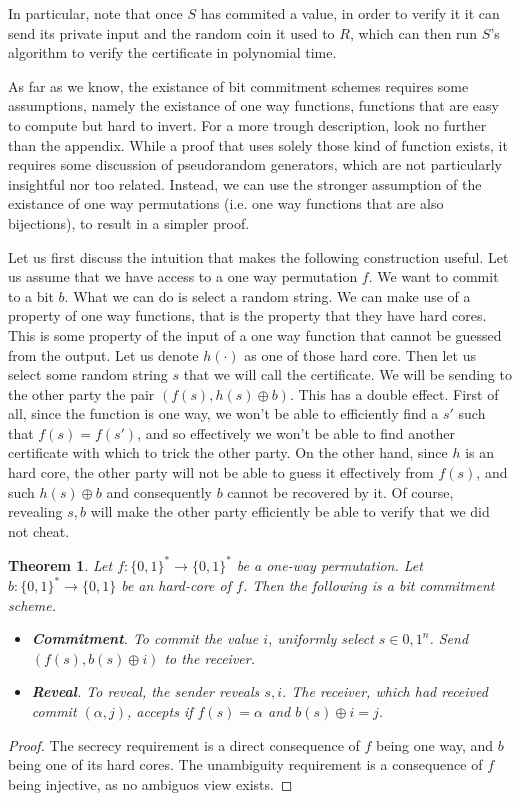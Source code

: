 \documentclass{article}
\newtheorem{theorem}{Theorem}
\begin{document}
In particular, note that once $S$ has commited a value, in order to verify it it can send its private input and the random coin it used to $R$, which can then
run $S$'s algorithm to verify the certificate in polynomial time. \par
As far as we know, the existance of bit commitment schemes requires some assumptions, namely the existance of one way functions, functions that are easy to compute but hard to invert.
For a more trough description, look no further than the appendix.
While a proof that uses solely those kind of function exists, it requires some discussion of pseudorandom generators, which are not particularly insightful nor too related.
Instead, we can use the stronger assumption of the existance of one way permutations (i.e. one way functions that are also bijections), to result in a simpler proof.\par
Let us first discuss the intuition that makes the following construction useful. Let us assume that we have access to a one way permutation $f$.
We want to commit to a bit $b$. What we can do is select a random string. We can make use of a property of one way functions, that is the 
property that they have hard cores. This is some property of the input of a one way function that cannot be guessed from the output. 
Let us denote $h(\cdot)$ as one of those hard core. Then let us select some random string $s$ that we will call the certificate. We will be sending to 
the other party the pair $(f(s), h(s) \oplus b)$. This has a double effect. First of all, since the function is one way, we won't be able to 
efficiently find a $s'$ such that $f(s) = f(s')$, and so effectively we won't be able to find another certificate with which to trick the other party. 
On the other hand, since $h$ is an hard core, the other party will not be able to guess it effectively from $f(s)$, and such $h(s) \oplus b$ and consequently $b$ cannot 
be recovered by it. Of course, revealing $s, b$ will make the other party efficiently be able to verify that we did not cheat.
\begin{theorem}
    Let $f: \{0, 1\}^* \to \{0, 1\}^*$ be a one-way permutation. Let $b: \{0, 1\}^* \to \{0, 1\}$ be an hard-core of $f$. Then the following is a bit commitment scheme.
    \begin{itemize}
        \item \textbf{Commitment}. To commit the value $i$, uniformly select $s \in {0, 1}^n$. Send $(f(s), b(s) \oplus i)$ to the receiver.
        \item \textbf{Reveal}. To reveal, the sender reveals $s, i$. The receiver, which had received commit $(\alpha, j)$, accepts if $f(s) = \alpha$ and $b(s) \oplus i = j$.
    \end{itemize}
\end{theorem}
\begin{proof}
    The secrecy requirement is a direct consequence of $f$ being one way, and $b$ being one of its hard cores.
    The unambiguity requirement is a consequence of $f$ being injective, as no ambiguos view exists.
\end{proof}
\end{document}
